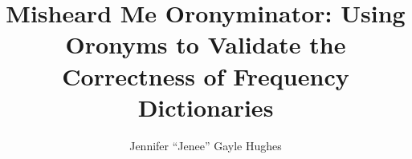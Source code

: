 \documentclass[12pt]{ucthesis}
\begin{document}

\title{Misheard Me Oronyminator: Using Oronyms to Validate the Correctness of Frequency Dictionaries}
\author{Jennifer ``Jenee'' Gayle Hughes}
  
 
     

\maketitle


%

\gdef \anIceColdHourOronymCount {152 }
\gdef \aNiceColdHourOronymCount {290 }
\gdef \forthRyeToOronymCount {39 }

\gdef \phaseOneANiceColdHourOronymsRecordedUnique {48 }
\gdef \phaseOneFourthRyeToOronymsRecordedUnique {10 }
\gdef \phaseOneTotalOronymsRecordedUnique {58 }

\gdef \phaseOneANiceColdHourOronymsRecordedTotal {62 }
\gdef \phaseOneFourthRyeToOronymsRecordedTotal{15 }

\gdef \uniqueUsersPhaseOneUserStudy {a dozen }
\gdef \numResponsesPhaseOneUserStudy {72 }
\gdef \numOronymsPhaseOneUserStudy {48 } %
\gdef \numForthRightOohOronymPhrases {10 }%
\gdef \numCorrectPronunciationPhaseOneUserStudy {71 }

\gdef \uniqueUsersPhaseTwoUserStudy {208 }
\gdef \uniqueUsersPhaseTwoUserStudyUSA {127 }

\gdef \numResponsesPhaseTwoUserStudy {851 }
\gdef \numResponsesPhaseTwoUserStudyUSA {489 }
\gdef \numResponsesPhaseTwoUserStudyIndia {239 }
\gdef \numResponsesPhaseTwoUserStudyEngland {37 }
\gdef \numResponsesPhaseTwoUserStudyCanada{35 }
\end{document}
